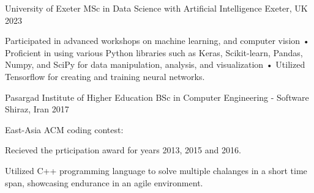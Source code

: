 \begin{cventries}

  \cventry
    {University of Exeter} %
    {MSc in Data Science with Artificial Intelligence} %
    {Exeter, UK} %
    {2023} %
    {
      \begin{cvitems} %
        \item {Participated in advanced workshops on machine learning, and computer vision • Proficient in using various Python libraries such as Keras, Scikit-learn, Pandas, Numpy, and SciPy for data manipulation, analysis, and visualization • Utilized Tensorflow for creating and training neural networks.}
      \end{cvitems}
    }
  \cventry
    {Pasargad Institute of Higher Education} %
    {BSc in Computer Engineering - Software} %
    {Shiraz, Iran} %
    {2017} %
    {
      \begin{cvitems} %
        \item {East-Asia ACM coding contest:}
        \vspace{4mm}  
        \begin{cvitems}
            \item{Recieved the prticipation award for years 2013, 2015 and 2016.}
            \item{Utilized C++ programming language to solve multiple chalanges in a short time span, showcasing endurance in an agile environment.}
          \end{cvitems}
      \end{cvitems}
    }
\end{cventries}
